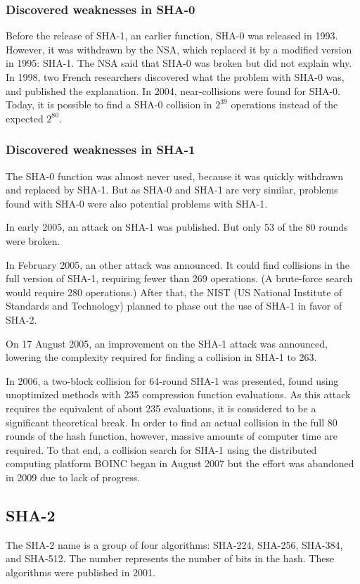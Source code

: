 \documentclass[12pt,a4paper]{article}
\begin{document}
\subsubsection{Discovered weaknesses in SHA-0}
Before the release of SHA-1, an earlier function, SHA-0 was released in 1993. However, it was withdrawn by the NSA, which replaced it by a modified version in 1995: SHA-1. The NSA said that SHA-0 was broken but did not explain why. In 1998, two French researchers discovered what the problem with SHA-0 was, and published the explanation. In 2004, near-collisions were found for SHA-0. Today, it is possible to find a SHA-0 collision in $2^{39}$ operations instead of the expected $2^{80}$.

\subsubsection{Discovered weaknesses in SHA-1}
The SHA-0 function was almost never used, because it was quickly withdrawn and replaced by SHA-1. But as SHA-0 and SHA-1 are very similar, problems found with SHA-0 were also potential problems with SHA-1.

In early 2005, an attack on SHA-1 was published. But only 53 of the 80 rounds were broken.

In February 2005, an other attack was announced. It could find collisions in the full version of SHA-1, requiring fewer than 269 operations. (A brute-force search would require 280 operations.) After that, the NIST (US National Institute of Standards and Technology) planned to phase out the use of SHA-1 in favor of SHA-2.

On 17 August 2005, an improvement on the SHA-1 attack was announced, lowering the complexity required for finding a collision in SHA-1 to 263.

In 2006, a two-block collision for 64-round SHA-1 was presented, found using unoptimized methods with 235 compression function evaluations. As this attack requires the equivalent of about 235 evaluations, it is considered to be a significant theoretical break. In order to find an actual collision in the full 80 rounds of the hash function, however, massive amounts of computer time are required. To that end, a collision search for SHA-1 using the distributed computing platform BOINC began in August 2007 but the effort was abandoned in 2009 due to lack of progress.


\subsection{SHA-2}
The SHA-2 name is a group of four algorithms: SHA-224, SHA-256, SHA-384, and SHA-512. The number represents the number of bits in the hash. These algorithms were published in 2001.
\end{document}
